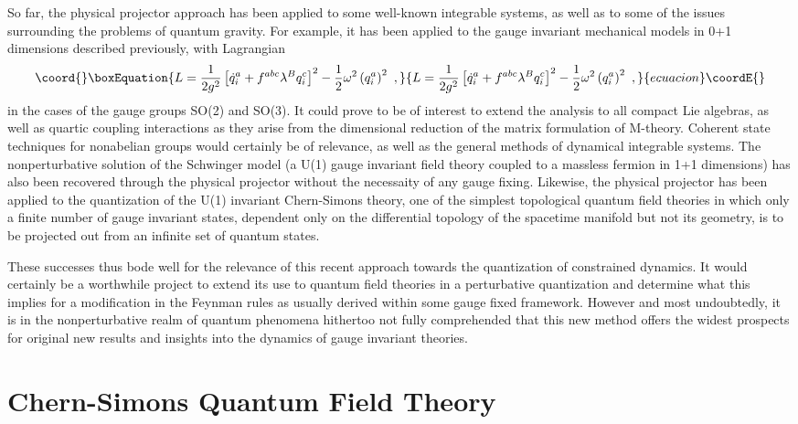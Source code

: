 \documentclass[a4paper,11pt]{article}
\begin{document}
So far, the physical projector approach has been applied to some well-known
integrable systems, as well as to some of the issues surrounding the
problems of quantum gravity.\cite{Klaud4} For example, it has been 
applied\cite{JG3,JG7} to the gauge invariant mechanical models in 0+1 
dimensions described previously, with Lagrangian
\begin{equation}\coord{}\boxEquation{
L=\frac{1}{2g^2}\left[\dot{q}^a_i+f^{abc}\lambda^Bq^c_i\right]^2-
\frac{1}{2}\omega^2\left(q^a_i\right)^2\ ,
}{
L=\frac{1}{2g^2}\left[\dot{q}^a_i+f^{abc}\lambda^Bq^c_i\right]^2-
\frac{1}{2}\omega^2\left(q^a_i\right)^2\ ,
}{ecuacion}\coordE{}\end{equation}
in the cases of the gauge groups SO(2) and SO(3). It could prove to be
of interest to extend the analysis to all compact Lie algebras,
as well as quartic coupling interactions as they arise from the dimensional
reduction of the matrix formulation of M-theory. Coherent state techniques
for nonabelian groups would certainly be of relevance, as well as
the general methods of dynamical integrable systems. The nonperturbative
solution of the Schwinger model (a U(1) gauge invariant field theory
coupled to a massless fermion in 1+1 dimensions) has also been recovered
through the physical projector without the necessaity of any gauge 
fixing.\cite{JG8} Likewise, the physical projector has been applied\cite{JG9} 
to the quantization of the U(1) invariant Chern-Simons theory, one of the 
simplest topological quantum field theories in which only a finite number 
of gauge invariant states, dependent only on the differential topology of 
the spacetime manifold but not its geometry, is to be projected out 
from an infinite set of quantum states.

These successes thus bode well for the relevance of this recent
approach towards the quantization of constrained dynamics. It would
certainly be a worthwhile project to extend its use to quantum field
theories in a perturbative quantization and determine what this implies for
a modification in the Feynman rules as usually derived within some gauge 
fixed framework. However and most undoubtedly, it is in the
nonperturbative realm of quantum phenomena hithertoo not fully
comprehended that this new method offers the widest prospects for original 
new results and insights into the dynamics of gauge invariant theories.

\section{Chern-Simons Quantum Field Theory}
\label{Sect6}
\end{document}
